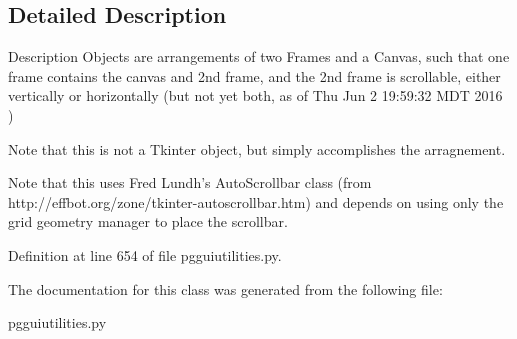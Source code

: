\subsection{Detailed Description}
\begin{DoxyVerb}Description
Objects are arrangements of two Frames and a 
Canvas, such that one frame contains the 
canvas and 2nd frame, and the 2nd frame 
is scrollable, either vertically or horizontally 
(but not yet both, as of Thu Jun  2 19:59:32 MDT 2016 )


Note that this is not a Tkinter object, but
simply accomplishes the arragnement. 

Note that this uses Fred Lundh's AutoScrollbar class
(from http://effbot.org/zone/tkinter-autoscrollbar.htm)
and depends on using only the grid geometry manager to place
the scrollbar.
\end{DoxyVerb}
 

Definition at line 654 of file pgguiutilities.\+py.



The documentation for this class was generated from the following file\+:\begin{DoxyCompactItemize}
\item 
pgguiutilities.\+py\end{DoxyCompactItemize}
